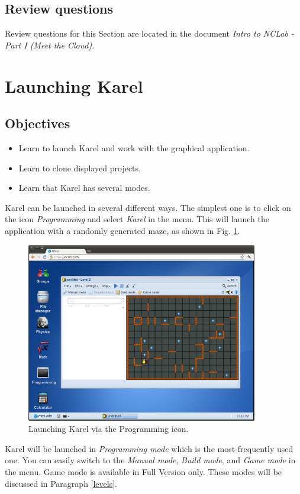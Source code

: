 \documentclass[article,A4,12pt]{llncs}
\begin{document}
\subsection{Review questions}

Review questions for this Section are located in the document {\em Intro to NCLab - Part I 
(Meet the Cloud)}.

\section{Launching Karel}

\subsection{Objectives} 
\begin{itemize}
\item Learn to launch Karel and work with the graphical application.
\item Learn to clone displayed projects.
\item Learn that Karel has several modes.
\end{itemize}
Karel can be launched in several different ways. The simplest one is to click on the icon 
{\em Programming} and select {\em Karel} in the menu. This will launch the application 
with a randomly generated maze, as shown in Fig. \ref{fig:init}.


\begin{figure}[!ht]
\begin{center}
\includegraphics[width=0.9\textwidth]{img/init.png}
\end{center}
\vspace{-2mm}
\caption{Launching Karel via the Programming icon.}
\label{fig:init}
\vspace{-1cm}
\end{figure}
\newpage
\noindent
Karel will be launched in {\em Programming mode} which is the most-frequently 
used one. You can easily switch to the {\em Manual mode}, {\em Build mode},
and {\em Game mode} in the menu. Game mode is available in Full Version only. 
These modes will be discussed in Paragraph \ref{levels}.
\end{document}
